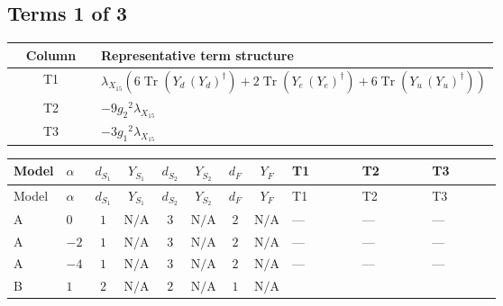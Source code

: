 \documentclass[8pt]{article}
\begin{document}
\begin{landscape}
\subsection*{Terms 1 of 3}
\begin{center}
\begin{tabular}{@{}c >{\raggedright\arraybackslash}p{0.82\linewidth}@{}}
\toprule
Column & Representative term structure \\
\midrule
T1 & \(\displaystyle {\lambda_{X_{15}}} (6 \operatorname{Tr}\!\left({Y_d}\,\left({Y_d}\right)^{\dagger}\right)+2 \operatorname{Tr}\!\left({Y_e}\,\left({Y_e}\right)^{\dagger}\right)+6 \operatorname{Tr}\!\left({Y_u}\,\left({Y_u}\right)^{\dagger}\right))\) \\
\midrule
T2 & \(\displaystyle -9 {g_2}^2 {\lambda_{X_{15}}}\) \\
\midrule
T3 & \(\displaystyle -3 {g_1}^2 {\lambda_{X_{15}}}\) \\
\midrule
\bottomrule
\end{tabular}
\end{center}
\smallskip
\tiny
\begin{longtable}{@{}llcccccc >{\raggedright\arraybackslash}p{0.21\linewidth} >{\raggedright\arraybackslash}p{0.21\linewidth} >{\raggedright\arraybackslash}p{0.21\linewidth}@{}}
\toprule
Model & $\alpha$ & $d_{S_1}$ & $Y_{S_1}$ & $d_{S_2}$ & $Y_{S_2}$ & $d_F$ & $Y_F$ & T1 & T2 & T3 \\
\midrule
\endfirsthead
\toprule
Model & $\alpha$ & $d_{S_1}$ & $Y_{S_1}$ & $d_{S_2}$ & $Y_{S_2}$ & $d_F$ & $Y_F$ & T1 & T2 & T3 \\
\midrule
\endhead
A & $0$ & $1$ & $\text{N/A}$ & $3$ & $\text{N/A}$ & $2$ & $\text{N/A}$ & --- & --- & --- \\
\midrule
A & $-2$ & $1$ & $\text{N/A}$ & $3$ & $\text{N/A}$ & $2$ & $\text{N/A}$ & --- & --- & --- \\
\midrule
A & $-4$ & $1$ & $\text{N/A}$ & $3$ & $\text{N/A}$ & $2$ & $\text{N/A}$ & --- & --- & --- \\
\midrule
B & $1$ & $2$ & $\text{N/A}$ & $2$ & $\text{N/A}$ & $1$ & $\text{N/A}$ & \scriptsize\adjustbox{max width=\linewidth}{$\begin{gathered} {\lambda_{X_{15}}} (6 \operatorname{Tr}\!\left({Y_d}\,\left({Y_d}\right)^{\dagger}\right)+2 \operatorname{Tr}\!\left({Y_e}\,\left({Y_e}\right)^{\dagger}\right)+6 \operatorname{Tr}\!\left({Y_u}\,\left({Y_u}\right)^{\dagger}\right))\end{gathered}$} & \scriptsize\adjustbox{max width=\linewidth}{$\begin{gathered} -9 {g_2}^2 {\lambda_{X_{15}}}\end{gathered}$} & \scriptsize\adjustbox{max width=\linewidth}{$\begin{gathered} -3 {g_1}^2 {\lambda_{X_{15}}}\end{gathered}$} \\

\end{longtable}
\end{landscape}
\end{document}
